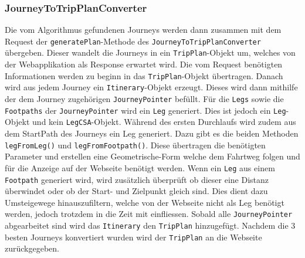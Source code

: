 \subsubsection{JourneyToTripPlanConverter}
Die vom Algorithmus gefundenen Journeys werden dann zusammen mit dem Request der \texttt{generatePlan}-Methode des \texttt{JourneyToTripPlanConverter} übergeben. Dieser wandelt die Journeys in ein \texttt{TripPlan}-Objekt um, welches von der Webapplikation als Response erwartet wird.
Die vom Request benötigten Informationen werden zu beginn in das \texttt{TripPlan}-Objekt übertragen. Danach wird aus jedem Journey ein \texttt{Itinerary}-Objekt erzeugt. Dieses wird dann mithilfe der dem Journey zugehörigen \texttt{JourneyPointer} befüllt. Für die \texttt{Legs} sowie die \texttt{Footpaths} der \texttt{JourneyPointer} wird ein \texttt{Leg} generiert. Dies ist jedoch ein \texttt{Leg}-Objekt und kein \texttt{LegCSA}-Objekt. Während des ersten Durchlaufs wird zudem aus dem StartPath des Journeys ein Leg generiert. Dazu gibt es die beiden Methoden \texttt{legFromLeg()} und \texttt{legFromFootpath()}. Diese übertragen die benötigten Parameter und erstellen eine Geometrische-Form welche dem Fahrtweg folgen und für die Anzeige auf der Webseite benötigt werden. Wenn ein \texttt{Leg} aus einem \texttt{Footpath} generiert wird, wird zusätzlich überprüft ob dieser eine Distanz überwindet oder ob der Start- und Zielpunkt gleich sind. Dies dient dazu Umsteigewege hinauszufiltern, welche von der Webseite nicht als Leg benötigt werden, jedoch trotzdem in die Zeit mit einfliessen. Sobald alle \texttt{JourneyPointer} abgearbeitet sind wird das \texttt{Itinerary} den \texttt{TripPlan} hinzugefügt. Nachdem die 3 besten Journeys konvertiert wurden wird der \texttt{TripPlan} an die Webseite zurückgegeben.
